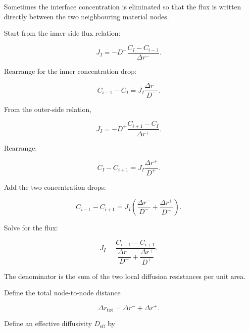 \documentclass[11pt,a4paper]{article}
\begin{document}
Sometimes the interface concentration is eliminated so that the flux is written directly between the two neighbouring material nodes.

Start from the inner-side flux relation:

\begin{equation}
J_I
=
-D^-
\frac{
C_I-C_{i-1}
}{
\Delta r^-
}.
\tag{TRISO-DIS-333}
\label{eq:triso-dis-333}
\end{equation}

Rearrange for the inner concentration drop:

\begin{equation}
C_{i-1}-C_I
=
J_I
\frac{\Delta r^-}{D^-}.
\tag{TRISO-DIS-334}
\label{eq:triso-dis-334}
\end{equation}

From the outer-side relation,

\begin{equation}
J_I
=
-D^+
\frac{
C_{i+1}-C_I
}{
\Delta r^+
}.
\tag{TRISO-DIS-335}
\label{eq:triso-dis-335}
\end{equation}

Rearrange:

\begin{equation}
C_I-C_{i+1}
=
J_I
\frac{\Delta r^+}{D^+}.
\tag{TRISO-DIS-336}
\label{eq:triso-dis-336}
\end{equation}

Add the two concentration drops:

\begin{equation}
C_{i-1}-C_{i+1}
=
J_I
\left(
\frac{\Delta r^-}{D^-}
+
\frac{\Delta r^+}{D^+}
\right).
\tag{TRISO-DIS-337}
\label{eq:triso-dis-337}
\end{equation}

Solve for the flux:

\begin{equation}
\boxed{
J_I
=
\frac{
C_{i-1}-C_{i+1}
}{
\dfrac{\Delta r^-}{D^-}
+
\dfrac{\Delta r^+}{D^+}
}.
}
\tag{TRISO-DIS-338}
\label{eq:triso-dis-338}
\end{equation}

The denominator is the sum of the two local diffusion resistances per unit area.

Define the total node-to-node distance

\begin{equation}
\Delta r_{\mathrm{tot}}
=
\Delta r^-+\Delta r^+.
\tag{TRISO-DIS-339}
\label{eq:triso-dis-339}
\end{equation}

Define an effective diffusivity $D_{\mathrm{eff}}$ by
\end{document}
